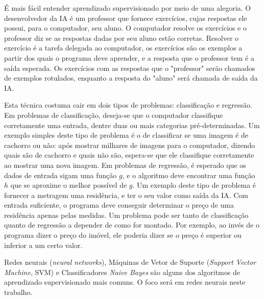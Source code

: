 É mais fácil entender aprendizado supervisionado por meio de uma alegoria. O desenvolvedor da IA é um professor que fornece exercícios, cujas respostas ele possui, para o computador, seu aluno. O computador resolve os exercícios e o professor diz se as respostas dadas por seu aluno estão corretas.
Resolver o exercício é a tarefa delegada ao computador, os exercícios são os exemplos a partir dos quais o programa deve aprender, e a resposta que o professor tem é a saída esperada. Os exercícios com as respostas que o "professor" serão chamados de exemplos rotulados, enquanto a resposta do "aluno" será chamada de saída da IA.

Esta técnica costuma cair em dois tipos de problemas: classificação e regressão.
Em problemas de classificação, deseja-se que o computador classifique corretamente uma entrada, dentre duas ou mais categorias pré-determinadas. Um exemplo simples deste tipo de problema é o de classificar se uma imagem é de cachorro ou não: após mostrar milhares de imagens para o computador, dizendo quais são de cachorro e quais não são, espera-se que ele classifique corretamente ao mostrar uma nova imagem.
Em problemas de regressão, é esperado que os dados de entrada sigam uma função $g$, e o algoritmo deve encontrar uma função $h$ que se aproxime o melhor possível de $g$. Um exemplo deste tipo de problema é fornecer a metragem uma residência, e ter o seu valor como saída da IA. Com entrada suficiente, o programa deve conseguir determinar o preço de uma residência apenas pelas medidas.
Um problema pode ser tanto de classificação quanto de regressão a depender de como for montado. Por exemplo, ao invés de o programa dizer o preço do imóvel, ele poderia dizer se o preço é superior ou inferior a um certo valor.

Redes neurais (\textit{neural networks}), Máquinas de Vetor de Suporte (\textit{Support Vector Machine}, SVM) e Classificadores \textit{Naive Bayes} são alguns dos algoritmos de aprendizado supervisionado mais comuns. O foco será em redes neurais neste trabalho.


